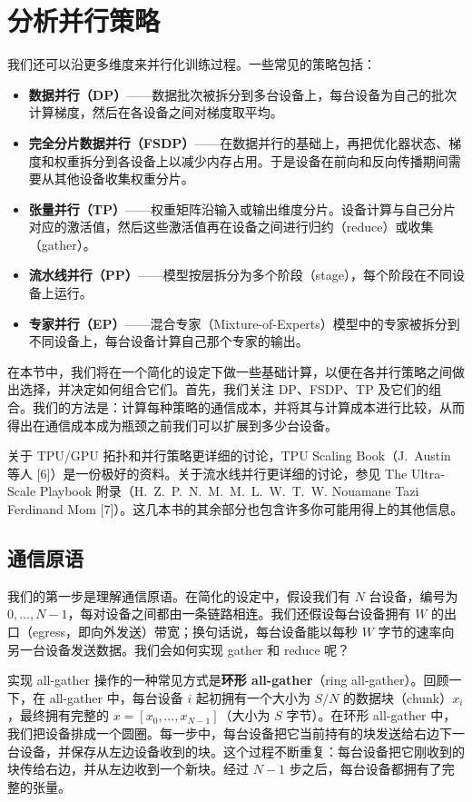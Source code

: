 \section{分析并行策略}

我们还可以沿更多维度来并行化训练过程。一些常见的策略包括：

\begin{itemize}
  \item \textbf{数据并行（DP）}——数据批次被拆分到多台设备上，每台设备为自己的批次计算梯度，然后在各设备之间对梯度取平均。
  \item \textbf{完全分片数据并行（FSDP）}——在数据并行的基础上，再把优化器状态、梯度和权重拆分到各设备上以减少内存占用。于是设备在前向和反向传播期间需要从其他设备收集权重分片。
  \item \textbf{张量并行（TP）}——权重矩阵沿输入或输出维度分片。设备计算与自己分片对应的激活值，然后这些激活值再在设备之间进行归约（reduce）或收集（gather）。
  \item \textbf{流水线并行（PP）}——模型按层拆分为多个阶段（stage），每个阶段在不同设备上运行。
  \item \textbf{专家并行（EP）}——混合专家（Mixture-of-Experts）模型中的专家被拆分到不同设备上，每台设备计算自己那个专家的输出。
\end{itemize}

在本节中，我们将在一个简化的设定下做一些基础计算，以便在各并行策略之间做出选择，并决定如何组合它们。首先，我们关注 DP、FSDP、TP 及它们的组合。我们的方法是：计算每种策略的通信成本，并将其与计算成本进行比较，从而得出在通信成本成为瓶颈之前我们可以扩展到多少台设备。

关于 TPU/GPU 拓扑和并行策略更详细的讨论，TPU Scaling Book（J.~Austin 等人 [6]）是一份极好的资料。关于流水线并行更详细的讨论，参见 The Ultra-Scale Playbook 附录（H.~Z.~P.~N.~M.~M.~L.~W.~T.~W. Nouamane Tazi Ferdinand Mom [7]）。这几本书的其余部分也包含许多你可能用得上的其他信息。

\subsection{通信原语}

我们的第一步是理解通信原语。在简化的设定中，假设我们有 $N$ 台设备，编号为 $0,\ldots,N-1$，每对设备之间都由一条链路相连。我们还假设每台设备拥有 $W$ 的出口（egress，即向外发送）带宽；换句话说，每台设备能以每秒 $W$ 字节的速率向另一台设备发送数据。我们会如何实现 gather 和 reduce 呢？

实现 all-gather 操作的一种常见方式是\textbf{环形 all-gather}（ring all-gather）。回顾一下，在 all-gather 中，每台设备 $i$ 起初拥有一个大小为 $S/N$ 的数据块（chunk）$x_i$，最终拥有完整的 $x=[x_0,\ldots,x_{N-1}]$（大小为 $S$ 字节）。在环形 all-gather 中，我们把设备排成一个圆圈。每一步中，每台设备把它当前持有的块发送给右边下一台设备，并保存从左边设备收到的块。这个过程不断重复：每台设备把它刚收到的块传给右边，并从左边收到一个新块。经过 $N-1$ 步之后，每台设备都拥有了完整的张量。

